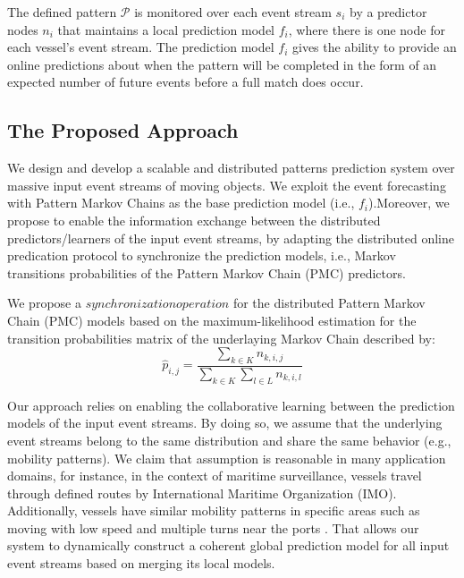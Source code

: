 The defined pattern $\mathcal{P}$ is monitored over each event stream $s_i$  by a  predictor nodes  $n_i$  that maintains a local prediction model $f_i$, where there is one node for each vessel's event stream.  The prediction model $f_i$ gives the ability to provide an online predictions about when the pattern will be completed in the form of an expected number of future events before a full match does occur.

\subsection{The Proposed Approach}
\label{sec:proposed_approach}
\par We design and develop a scalable and distributed patterns prediction system over massive input event streams of moving objects. We  exploit the event forecasting with Pattern Markov Chains \cite{alevizos2017event} as the base prediction model (i.e., $f_i$).Moreover,  we propose to enable the information exchange between the distributed predictors/learners of the input event streams, by adapting the distributed online predication protocol \cite{dekel2012optimal,kamp2014communication} to synchronize the prediction models, i.e., Markov transitions probabilities of the Pattern Markov Chain (PMC) predictors.

\par We propose a $synchronization operation$  for the distributed Pattern Markov Chain (PMC) models based on the maximum-likelihood estimation \citep{anderson1957statistical} for the transition probabilities matrix of the underlaying Markov Chain described by: 
\begin{equation}
\label{eq:pi_estim}
\hat{p}_{i,j}=\frac{\sum_{k \in K} n_{k,i,j}}{\sum_{k \in K} \sum_{l \in L} n_{k,i,l}}
\end{equation}


\par Our approach relies on enabling the collaborative learning between the prediction models of  the input event streams. By doing so, we assume that the underlying event streams belong to the same  distribution and share the same behavior (e.g., mobility patterns). We claim that assumption is reasonable in many application domains, for instance, in the context of maritime surveillance, vessels travel through defined routes by International Maritime Organization (IMO). Additionally, vessels have similar mobility patterns in specific areas such as moving with low speed and multiple turns near the ports \cite{pallotta2013vessel,liu2014knowledge}. That allows our system to dynamically construct a coherent global prediction model for all input event streams based on merging its local models.

